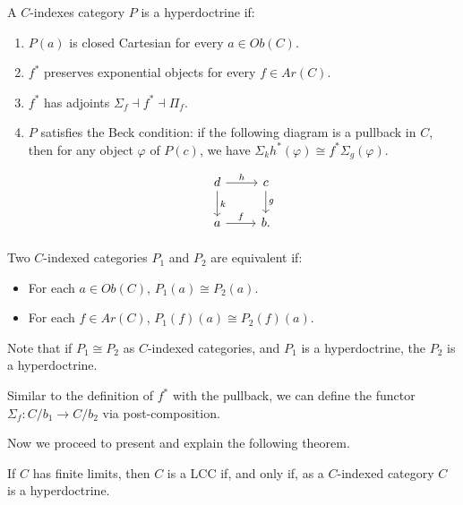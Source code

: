\begin{definition}
  A $C$-indexes category $P$ is a hyperdoctrine if:
  \begin{enumerate}
  \item $P(a)$ is closed Cartesian for every $a\in Ob(C)$.
  \item $f^*$ preserves exponential objects for every $f\in Ar(C)$.
  \item $f^*$ has adjoints $\Sigma_f \dashv f^* \dashv \Pi_f$.
  \item $P$ satisfies the Beck condition: if the following diagram is a pullback in $C$, then for any object $\varphi$ of $P(c)$,  we have $\Sigma_k h^*(\varphi) \cong f^*\Sigma_g(\varphi)$.
    \[
      \begin{tikzpicture}
        \node {\begin{tikzcd}
            d\ar[r,"h"]\ar[d,"k"] & c\ar[d,"g"]\\
            a\ar[r,"f"] &   b.
          \end{tikzcd}};
      \end{tikzpicture}
    \]
    
  \end{enumerate}
\end{definition}
\begin{definition}
  Two $C$-indexed categories $P_1$ and $P_2$ are equivalent if:
  \begin{itemize}
  \item For each $a\in Ob(C)$, $P_1(a)\cong P_2(a)$.
  \item For each $f\in Ar(C)$, $P_1(f)(a)\cong P_2(f)(a)$.
  \end{itemize}
\end{definition}

Note that if $P_1\cong P_2$ as $C$-indexed categories, and $P_1$ is a hyperdoctrine, the $P_2$ is a hyperdoctrine.

\begin{remark}
  Similar to the definition of $f^*$ with the pullback, we can define the functor $\Sigma_f: C/b_1 \to C/b_2$ via post-composition. 
\end{remark}


Now we proceed to present and explain the following theorem.

\begin{theorem}\label{theo:theox}
  If $C$ has finite limits, then $C$ is a LCC if, and only if, as a $C$-indexed category $C$ is a hyperdoctrine. 
\end{theorem}

